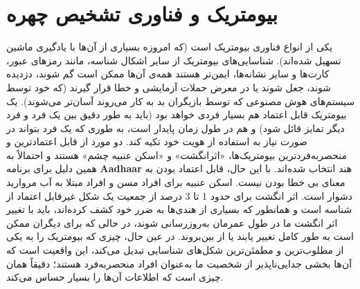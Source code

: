 {
\section*{بیومتریک و فناوری تشخیص چهره}
\label{sec:بیومتریک و فناوری تشخیص چهره}
یکی از انواع فناوری بیومتریک است (که امروزه بسیاری از آن‌ها با یادگیری ماشین تسهیل شده‌اند). شناسایی‌های بیومتریک از سایر اشکال شناسه، مانند رمزهای عبور، کارت‌ها و سایر نشانه‌ها، ایمن‌تر هستند همه‌ی آن‌ها ممکن است گم شوند، دزدیده شوند، جعل شوند یا در معرض حملات آزمایشی و خطا قرار گیرند (که خود توسط سیستم‌های هوش مصنوعی که توسط بازیگران بد به کار می‌روند آسان‌تر می‌شوند). یک بیومتریک قابل اعتماد هم بسیار فردی خواهد بود (باید به طور دقیق بین یک فرد و فرد دیگر تمایز قائل شود) و هم در طول زمان پایدار است، به طوری که یک فرد بتواند در صورت نیاز به استفاده از هویت خود تکیه کند. دو مورد از قابل اعتمادترین و منحصربه‌فردترین بیومتریک‌ها، «اثر‌انگشت» و «اسکن عنبیه چشم» هستند و احتمالاً به همین دلیل برای برنامه \textenglish{\textbf{Aadhaar}} هند انتخاب شده‌اند. با این حال، قابل اعتماد بودن به معنای بی خطا بودن نیست. اسکن عنبیه برای افراد مسن و افراد مبتلا به آب مروارید دشوار است. اثر انگشت برای حدود 1 تا 3 درصد از جمعیت یک شکل غیرقابل اعتماد از شناسه است و همانطور که بسیاری از هندی‌ها به ضرر خود کشف کرده‌اند، باید با تغییر اثر انگشت ما در طول عمرمان به‌روزرسانی شوند، در حالی که برای دیگران ممکن است به طور کامل تغییر یابند یا از بین‌بروند. در عین حال، چیزی که بیومتریک را به یکی از مطلوب‌ترین و مطمئن‌ترین شکل‌های شناسایی تبدیل می‌کند، این واقعیت است که آن‌ها بخشی جدایی‌ناپذیر از شخصیت ما به‌عنوان افراد منحصربه‌فرد هستند؛ دقیقاً همان چیزی است که اطلاعات آن‌ها را بسیار حساس می‌کند.
}

